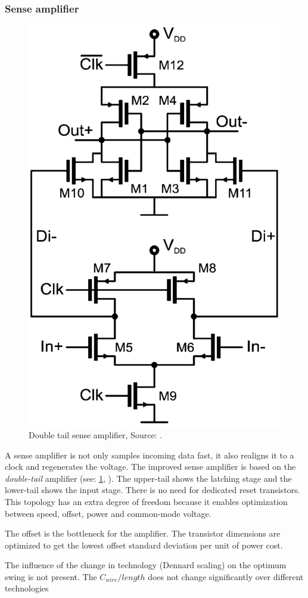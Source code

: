 \subsubsection{Sense amplifier} \label{sss:rep2:senseamp} %

\begin{figure}[]
	\centering
	\includegraphics[width=0.6\linewidth]{Figures/Rep2DoubleTail.png}
	\caption{Double tail sense amplifier, Source: \cite{schinkel2009low}.} 
    \label{fig:rep2:doubletail}
\end{figure}

A sense amplifier is not only samples incoming data fast, it also realigns it to a clock and regenerates the voltage.
The improved sense amplifier is based on the \textit{double-tail} amplifier (see: \cref{fig:rep2:doubletail}, \cite{schinkel2007double}).
The upper-tail shows the latching stage and the lower-tail shows the input stage.
There is no need for dedicated reset transistors.
This topology has an extra degree of freedom because it enables optimization between speed, offset, power and common-mode voltage.

The offset is the bottleneck for the amplifier.
The transistor dimensions are optimized to get the lowest offset standard deviation per unit of power cost.

The influence of the change in technology (Dennard scaling) on the optimum swing is not present.
The $C_{wire}/length$ does not change significantly over different technologies

